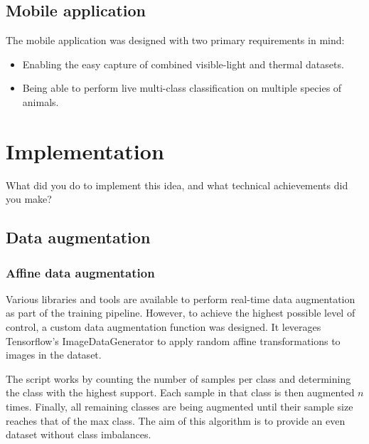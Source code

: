 \documentclass{l4proj}
\begin{document}


\section{Mobile application}

The mobile application was designed with two primary requirements in mind:

\begin{itemize}
  \item Enabling the easy capture of combined visible-light and thermal datasets.
  \item Being able to perform live multi-class classification on multiple species of animals.
\end{itemize}



\chapter{Implementation}
What did you do to implement this idea, and what technical achievements did you make?

\section{Data augmentation}

\subsection{Affine data augmentation}

Various libraries and tools are available to perform real-time data augmentation as part of the training pipeline. However, to achieve the highest possible level of control, a custom data augmentation function was designed. It leverages Tensorflow's ImageDataGenerator to apply random affine transformations to images in the dataset.

The script works by counting the number of samples per class and determining the class with the highest support. Each sample in that class is then augmented $n$ times. Finally, all remaining classes are being augmented until their sample size reaches that of the max class. The aim of this algorithm is to provide an even dataset without class imbalances.
\end{document}
